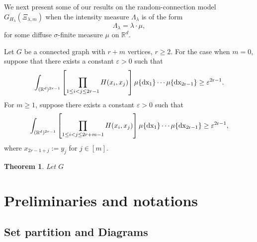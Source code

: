 \documentclass[12pt]{article}
\newcommand{\R}{\mathbb{R}}
\newtheorem{thm}[prop]{Theorem}
\numberwithin{equation}{section}
\begin{document}
We next present some of our results on the random-connection model $G_{H_\lambda}(\Xi_{\lambda,m})$ when the intensity measure $\Lambda_\lambda$ is of the form $$\Lambda_\lambda=\lambda\cdot\mu,$$
for some diffuse $\sigma$-finite measure $\mu$ on $\R^d$. 


Let $G$ be a connected graph with $r+m$ vertices, $r\ge2$. 
For the case when $m=0$, suppose that there exists a constant $\varepsilon>0$ such that 
\begin{equation}
  \int_{(\R^d)^{2r-1}}\left[\prod_{1\le i<j\le 2r-1}H(x_i,x_j)\right]\mu\{\rm{d}x_1\}\cdots\mu\{\rm{d}x_{2r-1}\}\ge \varepsilon^{2r-1}.
\end{equation}
For $m\ge1$, suppose there exists a constant $\varepsilon>0$ such that 
\begin{equation}
  \int_{(\R^d)^{2r-1}}\left[\prod_{1\le i<j\le 2r+m-1}H(x_i,x_j)\right]\mu\{\rm{d}x_1\}\cdots\mu\{\rm{d}x_{2r-1}\}\ge \varepsilon^{2r-1},
\end{equation}
where $x_{2r-1+j}:=y_j$ for $j\in[m]$.
\begin{thm}
  Let $G$
\end{thm}



 

\section{Preliminaries and notations}
\subsection*{Set partition and Diagrams}
\noindent 
\end{document}

